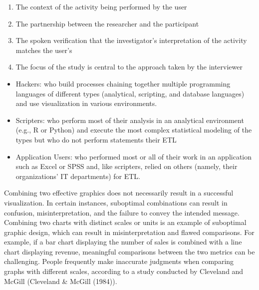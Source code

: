 \documentclass[print]{nuthesis}
\providecommand{\tightlist}{%
  \setlength{\itemsep}{0pt}\setlength{\parskip}{0pt}}
\begin{document}
\begin{enumerate}
\def\labelenumi{\arabic{enumi}.}
\tightlist
\item
  The context of the activity being performed by the user
\item
  The partnership between the researcher and the participant
\item
  The spoken verification that the investigator's interpretation of the activity matches the user's
\item
  The focus of the study is central to the approach taken by the interviewer
\end{enumerate}


\begin{itemize}
\tightlist
\item
  Hackers: who build processes chaining together multiple programming languages of different types (analytical, scripting, and database languages) and use visualization in various environments.
\item
  Scripters: who perform most of their analysis in an analytical environment (e.g., R or Python) and execute the most complex statistical modeling of the types but who do not perform statements their ETL
\item
  Application Users: who performed most or all of their work in an application such as Excel or SPSS and, like scripters, relied on others (namely, their organizations' IT departments) for ETL.
\end{itemize}

Combining two effective graphics does not necessarily result in a successful visualization.
In certain instances, suboptimal combinations can result in confusion, misinterpretation, and the failure to convey the intended message.
Combining two charts with distinct scales or units is an example of suboptimal graphic design, which can result in misinterpretation and flawed comparisons.
For example, if a bar chart displaying the number of sales is combined with a line chart displaying revenue, meaningful comparisons between the two metrics can be challenging.
People frequently make inaccurate judgments when comparing graphs with different scales, according to a study conducted by Cleveland and McGill (Cleveland \& McGill (1984)).
\end{document}
